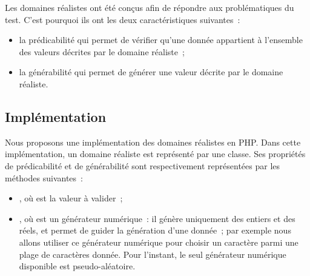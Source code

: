 \begin{definition}
\label{definition:language:realdom}

Les domaines réalistes ont été conçus afin de répondre aux problématiques du
test. C'est pourquoi ils ont les deux caractéristiques suivantes~:

\begin{itemize}

\item la {\strong prédicabilité} qui permet de vérifier qu'une donnée appartient
à l'ensemble des valeurs décrites par le domaine réaliste~;

\item la {\strong générabilité} qui permet de générer une valeur décrite par le
domaine réaliste.

\end{itemize}

\end{definition}


\subsection{Implémentation}
\label{subsection:language:realdom:implementation}

Nous proposons une implémentation des domaines réalistes en PHP. Dans cette
implémentation, un domaine réaliste est représenté par une {\strong classe}.
Ses propriétés de prédicabilité et de générabilité sont respectivement
représentées par les {\strong méthodes} suivantes~:

\begin{itemize}

\item {}, où  est la valeur à valider~;

\item {}, où  est un {\strong générateur
numérique}~: il génère uniquement des entiers et des réels, et permet de guider
la génération d'une donnée~; par exemple nous allons utiliser ce générateur
numérique pour choisir un caractère parmi une plage de caractères donnée.  Pour
l'instant, le seul générateur numérique disponible est pseudo-aléatoire.

\end{itemize}

